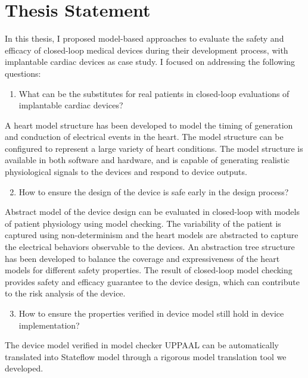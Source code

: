 \documentclass[a4paper,11pt]{article}
\begin{document}
\section*{Thesis Statement}
In this thesis, I proposed model-based approaches to evaluate the safety and efficacy of closed-loop medical devices during their development process, with implantable cardiac devices as case study.
I focused on addressing the following questions:
\begin{enumerate}

	\item What can be the substitutes for real patients in closed-loop evaluations of implantable cardiac devices?
\end{enumerate}
A heart model structure has been developed to model the timing of generation and conduction of electrical events in the heart.
The model structure can be configured to represent a large variety of heart conditions.
The model structure is available in both software and hardware, and is capable of generating realistic physiological signals to the devices and respond to device outputs.
\begin{enumerate}
\setcounter{enumi}{1}
\item How to ensure the design of the device is safe early in the design process? 
\end{enumerate}
Abstract model of the device design can be evaluated in closed-loop with models of patient physiology using model checking.
The variability of the patient is captured using non-determinism and the heart models are abstracted to capture the electrical behaviors observable to the devices.
An abstraction tree structure has been developed to balance the coverage and expressiveness of the heart models for different safety properties.
The result of closed-loop model checking provides safety and efficacy guarantee to the device design, which can contribute to the risk analysis of the device.
\begin{enumerate}
\setcounter{enumi}{2}
	\item How to ensure the properties verified in device model still hold in device implementation?
\end{enumerate}
The device model verified in model checker UPPAAL can be automatically translated into Stateflow model through a rigorous model translation tool we developed.
\end{document}
